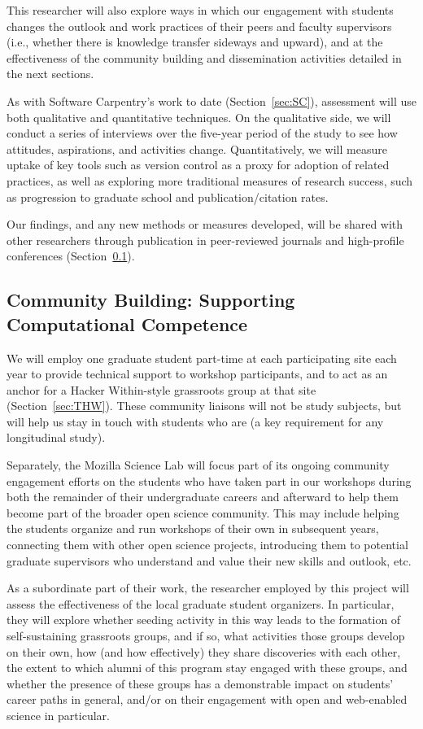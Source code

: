 \documentclass{proposalnsf}
\newlength{\up}
\begin{document}
This researcher will also explore ways in which our engagement with
students changes the outlook and work practices of their peers and
faculty supervisors (i.e., whether there is knowledge transfer
sideways and upward), and at the effectiveness of the community
building and dissemination activities detailed in the next sections.

As with Software Carpentry's work to date (Section~\ref{sec:SC}),
assessment will use both qualitative and quantitative techniques.  On
the qualitative side, we will conduct a series of interviews over the
five-year period of the study to see how attitudes, aspirations, and
activities change.  Quantitatively, we will measure uptake of key
tools such as version control as a proxy for adoption of related
practices, as well as exploring more traditional measures of research
success, such as progression to graduate school and
publication/citation rates.

Our findings, and any new methods or measures developed, will be
shared with other researchers through publication in peer-reviewed
journals and high-profile conferences (Section~\ref{sec:pub}).

\subsection{Community Building: Supporting Computational Competence}
\label{sec:pub}

We will employ one graduate student part-time at each participating
site each year to provide technical support to workshop participants,
and to act as an anchor for a Hacker Within-style grassroots group at
that site (Section~\ref{sec:THW}).  These community liaisons will not
be study subjects, but will help us stay in touch with students who
are (a key requirement for any longitudinal study).

Separately, the Mozilla Science Lab will focus part of its ongoing
community engagement efforts on the students who have taken part in
our workshops during both the remainder of their undergraduate careers
and afterward to help them become part of the broader
open science community.  This may include helping the students
organize and run workshops of their own in subsequent years,
connecting them with other open science projects, introducing them to
potential graduate supervisors who understand and value their new
skills and outlook, etc.

As a subordinate part of their work, the researcher employed by this
project will assess the effectiveness of the local graduate student
organizers.  In particular, they will explore whether seeding activity
in this way leads to the formation of self-sustaining grassroots
groups, and if so, what activities those groups develop on their own,
how (and how effectively) they share discoveries with each other, the
extent to which alumni of this program stay engaged with these groups,
and whether the presence of these groups has a demonstrable impact on
students' career paths in general, and/or on their engagement with
open and web-enabled science in particular.
\end{document}
